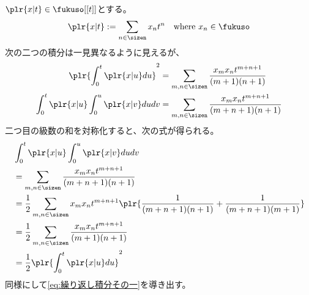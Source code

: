{	\begin{note}[積分計算その一]\label{note:積分計算その一} %
		$\plr{x|t}\in\fukuso[[t]]$とする。
		\begin{equation*}\begin{split}
			\plr{x|t} := \sum_{n\in\sizen} x_nt^n \quad\text{where } 
			x_n\in\fukuso
		\end{split}\end{equation*}
		次の二つの積分は一見異なるように見えるが、
		\begin{equation*}\begin{split}
			\plr{\int_0^t\plr{x|u}du}^2 &= \sum_{m,n\in\sizen} 
				\frac{x_mx_nt^{m+n+1}}{(m+1)(n+1)} \\
			\int_0^t\plr{x|u}\int_0^u\plr{x|v}dudv &= \sum_{m,n\in\sizen} 
				\frac{x_mx_nt^{m+n+1}}{(m+n+1)(n+1)} \\
		\end{split}\end{equation*}
		二つ目の級数の和を対称化すると、次の式が得られる。
		\begin{equation*}\begin{split}
			&\int_0^t\plr{x|u}\int_0^u\plr{x|v}dudv \\
			&= \sum_{m,n\in\sizen} \frac{x_mx_nt^{m+n+1}}{(m+n+1)(n+1)} \\
			&= \frac{1}{2}\sum_{m,n\in\sizen} x_mx_nt^{m+n+1}
				\plr{\frac{1}{(m+n+1)(n+1)} + \frac{1}{(m+n+1)(m+1)}} \\
			&= \frac{1}{2}\sum_{m,n\in\sizen} 
				\frac{x_mx_nt^{m+n+1}}{(m+1)(n+1)} \\
			&= \frac{1}{2}\plr{\int_0^t\plr{x|u}du}^2
		\end{split}\end{equation*}
		同様にして\eqref{eq:繰り返し積分その一}を導き出す。
	\end{note} %
}

